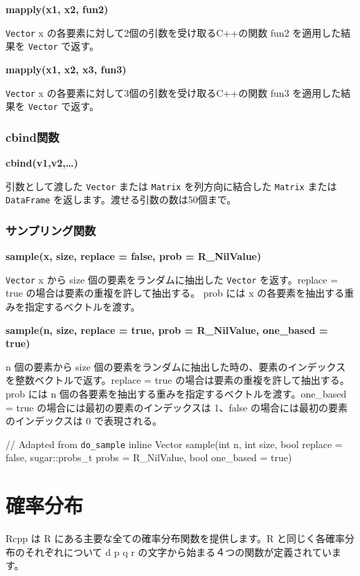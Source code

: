 \documentclass[]{book}
\begin{document}
\textbf{mapply(x1, x2, fun2)}

\texttt{Vector} x の各要素に対して2個の引数を受け取るC++の関数 fun2 を適用した結果を \texttt{Vector} で返す。

\textbf{mapply(x1, x2, x3, fun3)}

\texttt{Vector} x の各要素に対して3個の引数を受け取るC++の関数 fun3 を適用した結果を \texttt{Vector} で返す。

\hypertarget{cbind}{%
\subsection{cbind関数}\label{cbind}}

\textbf{cbind(v1,v2,\ldots{})}

引数として渡した \texttt{Vector} または \texttt{Matrix} を列方向に結合した \texttt{Matrix} または \texttt{DataFrame} を返します。渡せる引数の数は50個まで。

\subsection{サンプリング関数}

\textbf{sample(x, size, replace = false, prob = R\_NilValue)}

\texttt{Vector} x から size 個の要素をランダムに抽出した \texttt{Vector} を返す。replace = true の場合は要素の重複を許して抽出する。 prob には x の各要素を抽出する重みを指定するベクトルを渡す。

\textbf{sample(n, size, replace = true, prob = R\_NilValue, one\_based = true)}

n 個の要素から size 個の要素をランダムに抽出した時の、要素のインデックスを整数ベクトルで返す。replace = true の場合は要素の重複を許して抽出する。 prob には n 個の各要素を抽出する重みを指定するベクトルを渡す。one\_based = true の場合には最初の要素のインデックスは 1、false の場合には最初の要素のインデックスは 0 で表現される。

// Adapted from \texttt{do\_sample}
inline Vector
sample(int n, int size, bool replace = false, sugar::probs\_t probs = R\_NilValue, bool one\_based = true)

\chapter{確率分布}

Rcpp は R にある主要な全ての確率分布関数を提供します。R と同じく各確率分布のそれぞれについて d p q r の文字から始まる４つの関数が定義されています。
\end{document}
